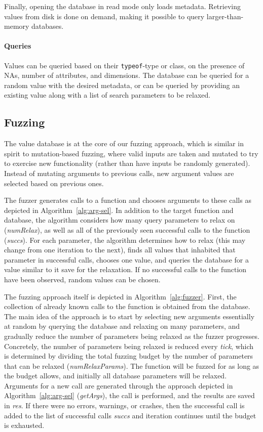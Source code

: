 \documentclass[sigplan,screen]{acmart}
\begin{document}
Finally, opening the database in {read mode} only loads metadata.
Retrieving values from disk is done on demand, making it possible to
query larger-than-memory databases.

\paragraph{Queries}

Values can be queried based on their {\tt typeof}-type or class, on
the presence of NAs, number of attributes, and dimensions.  The database
can be queried for a random value with the desired metadata, or can be queried by providing an
existing value along with a list of search parameters to be relaxed.  

\subsection{Fuzzing}

The value database is at the core of our fuzzing approach, which is
similar in spirit to mutation-based fuzzing, where valid inputs are taken 
and mutated to try to exercise new functionality (rather than have inputs 
be randomly generated). Instead of mutating arguments to previous calls, 
new argument values are selected based on previous ones.

The fuzzer generates calls to a function and chooses arguments to these
calls as depicted in Algorithm~\ref{alg:arg-sel}.  In addition to the
target function and database, the algorithm considers how many query
parameters to relax on (\emph{numRelax}), as well as all of the
previously seen successful calls to the function (\emph{succs}).
For each parameter, the algorithm determines how to relax (this may
change from one iteration to the next), finds all values that
inhabited that parameter in successful calls, chooses one value, and
queries the database for a value similar to it save for the
relaxation.  If no successful calls to the function have been
observed, random values can be chosen.

The fuzzing approach itself is depicted in Algorithm~\ref{alg:fuzzer}.
First, the collection of already known calls to the function is obtained
from the database.  The main idea of the approach is to start by
selecting new arguments essentially at random by querying the database
and relaxing on many parameters, and gradually reduce the number of
parameters being relaxed as the fuzzer progresses.  Concretely, the
number of parameters being relaxed is reduced every \emph{tick},
which is determined by dividing the total fuzzing budget by the number
of parameters that can be relaxed (\emph{numRelaxParams}).  The
function will be fuzzed for as long as the budget allows, and
initially all database parameters will be relaxed.  Arguments for a
new call are generated through the approach depicted in
Algorithm~\ref{alg:arg-sel} (\emph{getArgs}), the call is performed,
and the results are saved in \emph{res}.  If there were no errors,
warnings, or crashes, then the successful call is added to the list of
successful calls \emph{succs} and iteration continues until the
budget is exhausted.
\end{document}

